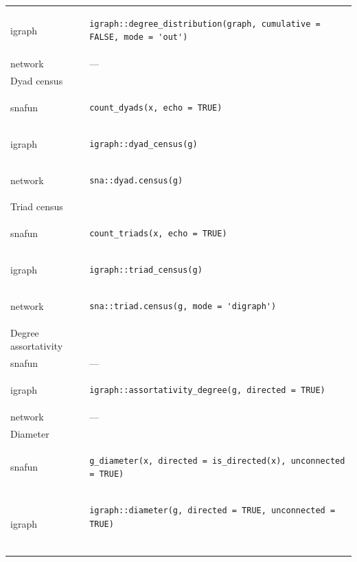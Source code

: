 \documentclass[
]{article}
\begin{document}
\begin{longtable}{ll}
igraph & \begin{verbatim}
igraph::degree_distribution(graph, cumulative = FALSE, mode = 'out')
\end{verbatim} \\ 
network & — \\ 
\midrule
\multicolumn{1}{l}{Dyad census} \\ 
\midrule
snafun & \begin{verbatim}
count_dyads(x, echo = TRUE)
\end{verbatim} \\ 
igraph & \begin{verbatim}
igraph::dyad_census(g)
\end{verbatim} \\ 
network & \begin{verbatim}
sna::dyad.census(g)
\end{verbatim} \\ 
\midrule
\multicolumn{1}{l}{Triad census} \\ 
\midrule
snafun & \begin{verbatim}
count_triads(x, echo = TRUE)
\end{verbatim} \\ 
igraph & \begin{verbatim}
igraph::triad_census(g)
\end{verbatim} \\ 
network & \begin{verbatim}
sna::triad.census(g, mode = 'digraph')
\end{verbatim} \\ 
\midrule
\multicolumn{1}{l}{Degree assortativity} \\ 
\midrule
snafun & — \\ 
igraph & \begin{verbatim}
igraph::assortativity_degree(g, directed = TRUE)
\end{verbatim} \\ 
network & — \\ 
\midrule
\multicolumn{1}{l}{Diameter} \\ 
\midrule
snafun & \begin{verbatim}
g_diameter(x, directed = is_directed(x), unconnected = TRUE)
\end{verbatim} \\ 
igraph & \begin{verbatim}
igraph::diameter(g, directed = TRUE, unconnected = TRUE)


\end{verbatim}
\end{longtable}
\end{document}
